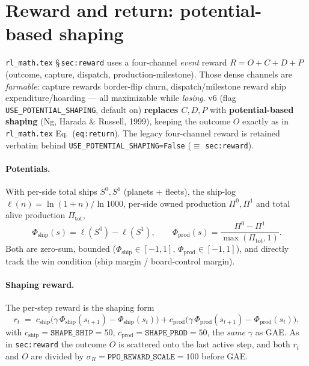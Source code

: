 \documentclass[11pt]{article}
\newcommand{\cd}[1]{\texttt{#1}}
\begin{document}
\section{Reward and return: potential-based shaping}\label{v6:reward}
\texttt{rl\_math.tex} \S\,\texttt{sec:reward} uses a four-channel \emph{event} reward
$R=O+C+D+P$ (outcome, capture, dispatch, production-milestone). Those dense channels are
\emph{farmable}: capture rewards border-flip churn, dispatch/milestone reward ship expenditure/hoarding
--- all maximizable while \emph{losing}. v6 (flag \cd{USE\_POTENTIAL\_SHAPING}, default on)
\textbf{replaces $C,D,P$} with \textbf{potential-based shaping} (Ng, Harada \& Russell, 1999), keeping the
outcome $O$ exactly as in \texttt{rl\_math.tex} Eq.~(\texttt{eq:return}). The legacy four-channel reward is retained verbatim
behind \cd{USE\_POTENTIAL\_SHAPING=False} ($\equiv$ \texttt{sec:reward}).

\paragraph{Potentials.} With per-side total ships $S^0,S^1$ (planets $+$ fleets), the ship-log
$\ell(n)=\ln(1{+}n)/\ln 1000$, per-side owned production $\Pi^0,\Pi^1$ and total alive production
$\Pi_{\mathrm{tot}}$,
\begin{equation}
\Phi_{\mathrm{ship}}(s)=\ell(S^0)-\ell(S^1),\qquad
\Phi_{\mathrm{prod}}(s)=\frac{\Pi^0-\Pi^1}{\max(\Pi_{\mathrm{tot}},1)} .
\end{equation}
Both are zero-sum, bounded ($\Phi_{\mathrm{ship}}\in[-1,1]$, $\Phi_{\mathrm{prod}}\in[-1,1]$), and
directly track the win condition (ship margin / board-control margin).

\paragraph{Shaping reward.} The per-step reward is the shaping form
\begin{equation}
r_t \;=\; c_{\mathrm{ship}}\big(\gamma\,\Phi_{\mathrm{ship}}(s_{t+1})-\Phi_{\mathrm{ship}}(s_t)\big)
        + c_{\mathrm{prod}}\big(\gamma\,\Phi_{\mathrm{prod}}(s_{t+1})-\Phi_{\mathrm{prod}}(s_t)\big),
\label{v6:shape}
\end{equation}
with $c_{\mathrm{ship}}=\cd{SHAPE\_SHIP}=50$, $c_{\mathrm{prod}}=\cd{SHAPE\_PROD}=50$, the \emph{same}
$\gamma$ as GAE. As in \texttt{sec:reward} the outcome $O$ is scattered onto the last active step, and
both $r_t$ and $O$ are divided by $\sigma_R=\cd{PPO\_REWARD\_SCALE}=100$ before GAE.
\end{document}
